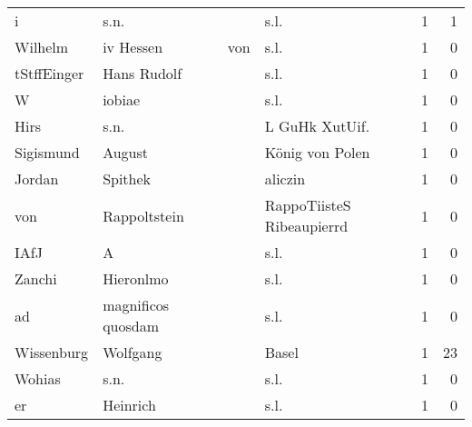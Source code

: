 \begin{center}
\begin{tiny}
\begin{longtabu}{llllrr}
                        i &                               s.n. &             &                                        s.l. &          1 &         1 \\
                  Wilhelm &                         iv  Hessen &         von &                                        s.l. &          1 &         0 \\
              tStffEinger &                        Hans Rudolf &             &                                        s.l. &          1 &         0 \\
                        W &                             iobiae &             &                                        s.l. &          1 &         0 \\
                     Hirs &                               s.n. &             &                             L GuHk XutUif.  &          1 &         0 \\
                Sigismund &                             August &             &                             König von Polen &          1 &         0 \\
                   Jordan &                            Spithek &             &                                     aliczin &          1 &         0 \\
                      von &                       Rappoltstein &             &                   RappoTiisteS Ribeaupierrd &          1 &         0 \\
                     IAfJ &                                  A &             &                                        s.l. &          1 &         0 \\
                   Zanchi &                          Hieronlmo &             &                                        s.l. &          1 &         0 \\
                       ad &                 magnificos quosdam &             &                                        s.l. &          1 &         0 \\
               Wissenburg &                           Wolfgang &             &                                       Basel &          1 &        23 \\
                   Wohias &                               s.n. &             &                                        s.l. &          1 &         0 \\
                       er &                           Heinrich &             &                                        s.l. &          1 &         0 \\

\end{longtabu}
\end{tiny}
\end{center}
